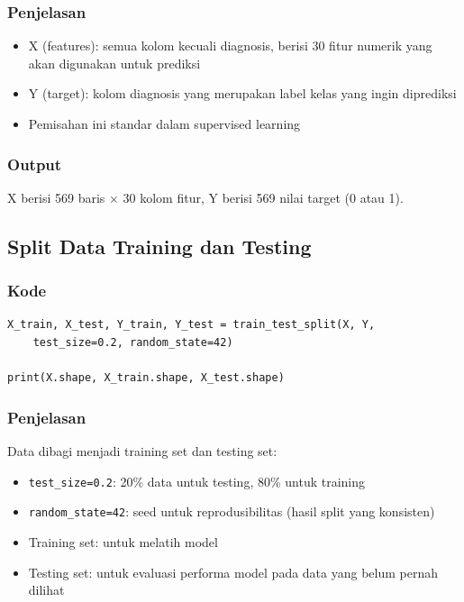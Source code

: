 \documentclass[12pt,a4paper]{article}
\begin{document}
\subsubsection{Penjelasan}
\begin{itemize}
    \item X (features): semua kolom kecuali diagnosis, berisi 30 fitur numerik yang akan digunakan untuk prediksi
    \item Y (target): kolom diagnosis yang merupakan label kelas yang ingin diprediksi
    \item Pemisahan ini standar dalam supervised learning
\end{itemize}

\subsubsection{Output}
X berisi 569 baris × 30 kolom fitur, Y berisi 569 nilai target (0 atau 1).

\subsection{Split Data Training dan Testing}

\subsubsection{Kode}
\begin{lstlisting}[style=pythonstyle]
X_train, X_test, Y_train, Y_test = train_test_split(X, Y, 
    test_size=0.2, random_state=42)

print(X.shape, X_train.shape, X_test.shape)
\end{lstlisting}

\subsubsection{Penjelasan}
Data dibagi menjadi training set dan testing set:
\begin{itemize}
    \item \texttt{test\_size=0.2}: 20\% data untuk testing, 80\% untuk training
    \item \texttt{random\_state=42}: seed untuk reprodusibilitas (hasil split yang konsisten)
    \item Training set: untuk melatih model
    \item Testing set: untuk evaluasi performa model pada data yang belum pernah dilihat
\end{itemize}
\end{document}
